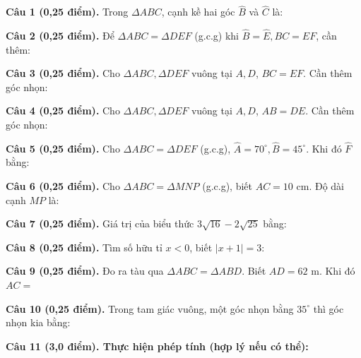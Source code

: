 \documentclass[12pt,a4paper]{article}
\begin{document}
\vspace{1.2mm}
\noindent\textbf{Câu 1 (0,25 điểm).} Trong $\Delta ABC$, cạnh kề hai góc $\widehat{B}$ và $\widehat{C}$ là: \par\vspace{3.0mm}
\noindent\textbf{Câu 2 (0,25 điểm).} Để $\Delta ABC = \Delta DEF$ (g.c.g) khi $\widehat{B}=\widehat{E}, BC=EF$, cần thêm: \par\vspace{3.0mm}
\noindent\textbf{Câu 3 (0,25 điểm).} Cho $\Delta ABC, \Delta DEF$ vuông tại $A, D$, $BC=EF$. Cần thêm góc nhọn: \par\vspace{3.0mm}
\noindent\textbf{Câu 4 (0,25 điểm).} Cho $\Delta ABC, \Delta DEF$ vuông tại $A, D$, $AB=DE$. Cần thêm góc nhọn: \par\vspace{3.0mm}
\noindent\textbf{Câu 5 (0,25 điểm).} Cho $\Delta ABC = \Delta DEF$ (g.c.g), $\widehat{A}=70^\circ, \widehat{B}=45^\circ$. Khi đó $\widehat{F}$ bằng: \par\vspace{3.0mm}
\noindent\textbf{Câu 6 (0,25 điểm).} Cho $\Delta ABC = \Delta MNP$ (g.c.g), biết $AC = 10\text{ cm}$. Độ dài cạnh $MP$ là: \par\vspace{3.0mm}
\noindent\textbf{Câu 7 (0,25 điểm).} Giá trị của biểu thức $3\sqrt{16} - 2\sqrt{25}$ bằng: \par\vspace{3.0mm}
\noindent\textbf{Câu 8 (0,25 điểm).} Tìm số hữu tỉ $x < 0$, biết $|x + 1| = 3$: \par\vspace{3.0mm}
\noindent\textbf{Câu 9 (0,25 điểm).} Đo ra tàu qua $\Delta ABC = \Delta ABD$. Biết $AD = 62\text{ m}$. Khi đó $AC = $ \par\vspace{3.0mm}
\noindent\textbf{Câu 10 (0,25 điểm).} Trong tam giác vuông, một góc nhọn bằng $35^\circ$ thì góc nhọn kia bằng: \par\vspace{3.0mm}
\vspace{0.2mm}
\noindent\textbf{Câu 11 (3,0 điểm). Thực hiện phép tính (hợp lý nếu có thể):}
\vspace{0.6mm}
\end{document}
